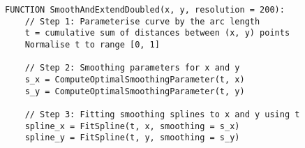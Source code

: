 \documentclass[12pt]{article}
\begin{document}
\begin{figure}[H]
\begin{verbatim}
FUNCTION SmoothAndExtendDoubled(x, y, resolution = 200):
    // Step 1: Parameterise curve by the arc length
    t = cumulative sum of distances between (x, y) points
    Normalise t to range [0, 1]

    // Step 2: Smoothing parameters for x and y
    s_x = ComputeOptimalSmoothingParameter(t, x)
    s_y = ComputeOptimalSmoothingParameter(t, y)

    // Step 3: Fitting smoothing splines to x and y using t
    spline_x = FitSpline(t, x, smoothing = s_x)
    spline_y = FitSpline(t, y, smoothing = s_y)
\end{verbatim}

\end{figure}
\end{document}
